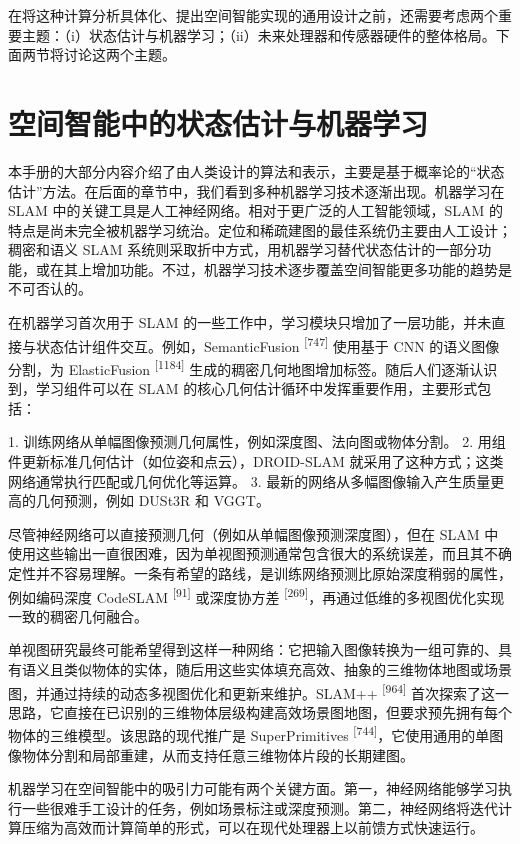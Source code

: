 在将这种计算分析具体化、提出空间智能实现的通用设计之前，还需要考虑两个重要主题：（i）状态估计与机器学习；（ii）未来处理器和传感器硬件的整体格局。下面两节将讨论这两个主题。

\section{空间智能中的状态估计与机器学习}

本手册的大部分内容介绍了由人类设计的算法和表示，主要是基于概率论的“状态估计”方法。在后面的章节中，我们看到多种机器学习技术逐渐出现。机器学习在 SLAM 中的关键工具是人工神经网络。相对于更广泛的人工智能领域，SLAM 的特点是尚未完全被机器学习统治。定位和稀疏建图的最佳系统仍主要由人工设计；稠密和语义 SLAM 系统则采取折中方式，用机器学习替代状态估计的一部分功能，或在其上增加功能。不过，机器学习技术逐步覆盖空间智能更多功能的趋势是不可否认的。

在机器学习首次用于 SLAM 的一些工作中，学习模块只增加了一层功能，并未直接与状态估计组件交互。例如，SemanticFusion \textsuperscript{[747]} 使用基于 CNN 的语义图像分割，为 ElasticFusion \textsuperscript{[1184]} 生成的稠密几何地图增加标签。随后人们逐渐认识到，学习组件可以在 SLAM 的核心几何估计循环中发挥重要作用，主要形式包括：

1. 训练网络从单幅图像预测几何属性，例如深度图、法向图或物体分割。
2. 用组件更新标准几何估计（如位姿和点云），DROID-SLAM 就采用了这种方式；这类网络通常执行匹配或几何优化等运算。
3. 最新的网络从多幅图像输入产生质量更高的几何预测，例如 DUSt3R 和 VGGT。

尽管神经网络可以直接预测几何（例如从单幅图像预测深度图），但在 SLAM 中使用这些输出一直很困难，因为单视图预测通常包含很大的系统误差，而且其不确定性并不容易理解。一条有希望的路线，是训练网络预测比原始深度稍弱的属性，例如编码深度 CodeSLAM \textsuperscript{[91]} 或深度协方差 \textsuperscript{[269]}，再通过低维的多视图优化实现一致的稠密几何融合。

单视图研究最终可能希望得到这样一种网络：它把输入图像转换为一组可靠的、具有语义且类似物体的实体，随后用这些实体填充高效、抽象的三维物体地图或场景图，并通过持续的动态多视图优化和更新来维护。SLAM++ \textsuperscript{[964]} 首次探索了这一思路，它直接在已识别的三维物体层级构建高效场景图地图，但要求预先拥有每个物体的三维模型。该思路的现代推广是 SuperPrimitives \textsuperscript{[744]}，它使用通用的单图像物体分割和局部重建，从而支持任意三维物体片段的长期建图。

机器学习在空间智能中的吸引力可能有两个关键方面。第一，神经网络能够学习执行一些很难手工设计的任务，例如场景标注或深度预测。第二，神经网络将迭代计算压缩为高效而计算简单的形式，可以在现代处理器上以前馈方式快速运行。

